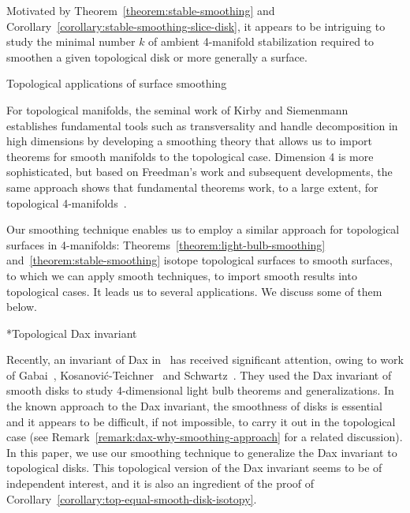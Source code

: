 \documentclass[11pt]{amsart}
\makeatletter
\def\subsection{\@startsection{subsection}{2}%
  \z@{-.8\linespacing\@plus-.3\linespacing}{.5\linespacing\@plus.2\linespacing}%
  {\normalfont\bfseries\large}}
\def\subsubsection{\@startsection{subsubsection}{3}%
  \z@{.7\linespacing\@plus.2\linespacing}{-1.5ex}%
  {\normalfont\bfseries}}
\theoremstyle{definition}
\theoremstyle{theorem-giventitle}
\theoremstyle{definition-giventitle}
\numberwithin{equation}{section}
\makeatother
\begin{document}
Motivated by Theorem~\ref{theorem:stable-smoothing} and Corollary~\ref{corollary:stable-smoothing-slice-disk}, it appears to be intriguing to study the minimal number $k$ of ambient 4-manifold stabilization required to smoothen a given topological disk or more generally a surface.


\subsection{Topological applications of surface smoothing}

For topological manifolds, the seminal work of Kirby and Siemenmann~\cite{Kirby-Siebenmann:1977-1} establishes fundamental tools such as transversality and handle decomposition in high dimensions by developing a smoothing theory that allows us to import theorems for smooth manifolds to the topological case.
Dimension 4 is more sophisticated, but based on Freedman's work and subsequent developments, the same approach shows that fundamental theorems work, to a large extent, for topological 4-manifolds~\cite{Freedman-Quinn:1990-1}.

Our smoothing technique enables us to employ a similar approach for topological surfaces in 4-manifolds: Theorems~\ref{theorem:light-bulb-smoothing} and~\ref{theorem:stable-smoothing} isotope topological surfaces to smooth surfaces, to which we can apply smooth techniques, to import smooth results into topological cases.
It leads us to several applications.
We discuss some of them below.

\subsubsection*{Topological Dax invariant}

Recently, an invariant of Dax in~\cite{Dax:1972-1} has received significant attention, owing to work of Gabai~\cite{Gabai:2021-1}, Kosanovi\'c-Teichner~\cite{Kosanovic-Teichner:2024-1,Kosanovic-Teichner:2024-2} and Schwartz~\cite{Schwartz:2021-1}.
They used the Dax invariant of smooth disks to study 4-dimensional light bulb theorems and generalizations.
In the known approach to the Dax invariant, the smoothness of disks is essential and it appears to be difficult, if not impossible, to carry it out in the topological case (see Remark~\ref{remark:dax-why-smoothing-approach} for a related discussion).
In this paper, we use our smoothing technique to generalize the Dax invariant to topological disks.
This topological version of the Dax invariant seems to be of independent interest, and it is also an ingredient of the proof of Corollary~\ref{corollary:top-equal-smooth-disk-isotopy}\@.
\end{document}
